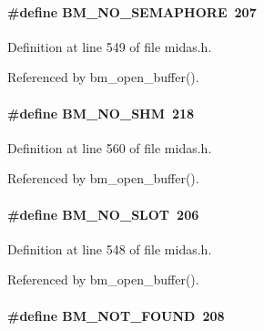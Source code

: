 \paragraph[{BM\_\-NO\_\-SEMAPHORE}]{\setlength{\rightskip}{0pt plus 5cm}\#define BM\_\-NO\_\-SEMAPHORE~207}\hfill\label{group__err22_gaf9bc9724347f2c84c37b2725b0fa6b2c}

\begin{DoxyItemize}
\item 
\end{DoxyItemize}

Definition at line 549 of file midas.h.

Referenced by bm\_\-open\_\-buffer().
\paragraph[{BM\_\-NO\_\-SHM}]{\setlength{\rightskip}{0pt plus 5cm}\#define BM\_\-NO\_\-SHM~218}\hfill\label{group__err22_gaf32276ec7c00c33b4c45bd0b382b8ffb}

\begin{DoxyItemize}
\item 
\end{DoxyItemize}

Definition at line 560 of file midas.h.

Referenced by bm\_\-open\_\-buffer().
\paragraph[{BM\_\-NO\_\-SLOT}]{\setlength{\rightskip}{0pt plus 5cm}\#define BM\_\-NO\_\-SLOT~206}\hfill\label{group__err22_ga5d9eb250e07354dc4d5de87388feff44}

\begin{DoxyItemize}
\item 
\end{DoxyItemize}

Definition at line 548 of file midas.h.

Referenced by bm\_\-open\_\-buffer().
\paragraph[{BM\_\-NOT\_\-FOUND}]{\setlength{\rightskip}{0pt plus 5cm}\#define BM\_\-NOT\_\-FOUND~208}\hfill\label{group__err22_ga3ec707ba57a9f56c19bf8d8581d8291b}

